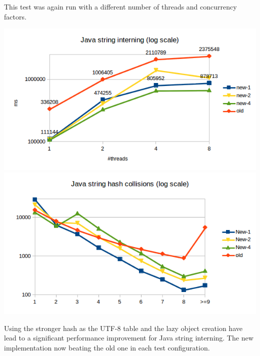 \documentclass[12pt,a4paper,oneside]{article}
\begin{document}
	This test was again run with a different number of threads and concurrency factors.

	\includegraphics{jstr-intern-time.png}
	\includegraphics{jstr-intern-collisions.png}

	Using the stronger hash as the UTF-8 table and the lazy object creation have lead to a significant performance
	improvement for Java string interning.
	The new implementation now beating the old one in each test configuration.
\end{document}
